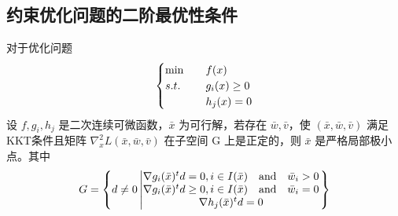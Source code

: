 \subsection{约束优化问题的二阶最优性条件}
\begin{theorem}[二阶充分条件]
    对于优化问题
    \[
        \begin{cases}
            \min \quad &f(x) \\
            s.t. \quad &g_i(x) \ge 0\\
            &h_j(x) = 0
        \end{cases}    
    \]
    设 $f, g_i, h_j$ 是二次连续可微函数，$\bar{x}$ 为可行解，若存在 $\bar{w}, \bar{v}$，使 $(\bar{x}, \bar{w}, \bar{v})$ 满足KKT条件且矩阵 $\nabla^2_xL(\bar{x}, \bar{w}, \bar{v})$ 在子空间 G 上是正定的，则 $\bar{x}$ 是严格局部极小点。其中
    \[
        G = \left\{
            d \neq 0 \left|
            \begin{matrix}
                \nabla g_i(\bar{x})^td = 0, i \in I(\bar{x}) \qand \bar{w}_i > 0\\
                \nabla g_i(\bar{x})^td \ge 0, i \in I(\bar{x}) \qand \bar{w}_i = 0\\
                \nabla h_j(\bar{x})^td = 0    
            \end{matrix}\right.
        \right\}
    \]
\end{theorem}


